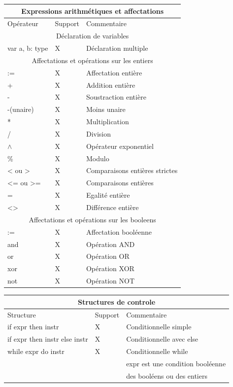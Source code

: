 \documentclass[a4paper]{article}
\begin{document}
\begin{center}
\begin{tabular}{|l|l|l|}
  \hline
  \multicolumn{3}{|c|}{Expressions arithmétiques et affectations} \\
  \hline
  Opérateur & Support & Commentaire \\
  \hline
  \multicolumn{3}{|c|}{Déclaration de variables} \\
  \hline
  var a, b: type & X & Déclaration multiple \\
  \hline
  \multicolumn{3}{|c|}{Affectations et opérations sur les entiers} \\
  \hline
  := & X & Affectation entière\\
  + & X & Addition entière \\
  - & X & Soustraction entière \\
  -(unaire) & X & Moins unaire \\
  * & X & Multiplication \\
  / & X & Division \\
  $\wedge$ & X & Opérateur exponentiel \\
  \% & X & Modulo \\
  < ou > & X & Comparaisons entières strictes \\
  <= ou >= & X & Comparaisons entières \\
  = & X & Egalité entière \\
  <> & X & Différence entière \\
  \hline
  \multicolumn{3}{|c|}{Affectations et opérations sur les booleens} \\
  \hline
  := & X & Affectation booléenne \\
  and & X & Opération AND \\
  or & X & Opération OR \\
  xor & X & Opération XOR \\
  not & X & Opération NOT \\
  \hline
\end{tabular}

\begin{tabular}{|l|l|l|}
  \hline
  \multicolumn{3}{|c|}{Structures de controle} \\
  \hline
  Structure & Support & Commentaire \\
  \hline
  if expr then instr & X & Conditionnelle simple \\
  if expr then instr else instr & X & Conditionnelle avec else \\
  while expr do instr & X & Conditionnelle while \\
  & & expr est une condition booléenne \\
  & & des booléens ou des entiers \\
  \hline
\end{tabular}



\end{center}
\end{document}
